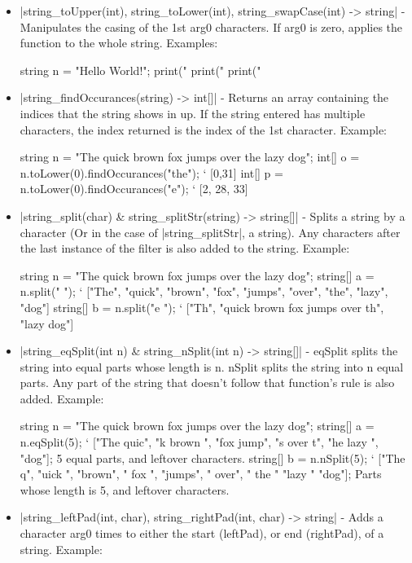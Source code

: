 \documentclass[12pt, letterpaper, oneside]{article}
\begin{document}
	\begin{itemize}
		\item[--] \spverb|string_toUpper(int), string_toLower(int), string_swapCase(int) -> string| - Manipulates the casing of the 1st arg0 characters. If arg0 is zero, applies the function to the whole string. Examples:
		
		\begin{spverbatim}
			string n = "Hello World!";
			print("\n%
			print("\n%
			print("\n%
		\end{spverbatim}
		\item[--] \spverb|string_findOccurances(string) -> int[]| - Returns an array \newline containing the indices that the string shows in up. If the string entered has multiple characters, the index returned is the index of the 1st character. Example:
		
		
		\begin{spverbatim}
			string n = "The quick brown fox jumps over the lazy dog";
			int[] o = n.toLower(0).findOccurances("the"); ` [0,31]
			int[] p = n.toLower(0).findOccurances("e"); ` [2, 28, 33]
		\end{spverbatim}
		\item[--] \spverb|string_split(char) & string_splitStr(string) -> string[]| - Splits a string by a character (Or in the case of \spverb|string_splitStr|, a string). Any characters after the last instance of the filter is also added to the string. Example:
		
		\begin{spverbatim}
			string n = "The quick brown fox jumps over the lazy dog";
			string[] a = n.split(" "); ` ["The", "quick", "brown", "fox", "jumps", "over", "the", "lazy", "dog"]
			string[] b = n.split("e "); ` ["Th", "quick brown fox jumps over th", "lazy dog"]
		\end{spverbatim}
		\item[--] \spverb|string_eqSplit(int n) & string_nSplit(int n) -> string[]| - \newline eqSplit splits the string into equal parts whose length is n. nSplit splits the string into n equal parts. Any part of the string that doesn't follow that function's rule is also added. Example:
		
		
		\begin{spverbatim}
			string n = "The quick brown fox jumps over the lazy dog";
			string[] a = n.eqSplit(5); ` ["The quic", "k brown ", "fox jump", "s over t", "he lazy ", "dog"]; 5 equal parts, and leftover characters.
			string[] b = n.nSplit(5); ` ["The q", "uick ", "brown", " fox ", "jumps", " over", " the " "lazy " "dog"]; Parts whose length is 5, and leftover characters.
		\end{spverbatim}
		\item[--] \spverb|string_leftPad(int, char), string_rightPad(int, char) -> string| - Adds a character arg0 times to either the start (leftPad), or end (rightPad), of a string. Example:
		

\end{itemize}
\end{document}
